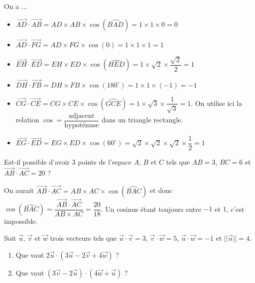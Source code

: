 \documentclass[11pt,fleqn, openany]{book} %
\begin{document}
\begin{solution}On a ...
\begin{itemize}
\item $\overrightarrow{AD} \cdot \overrightarrow{AB} = AD \times AB \times \cos (\widehat{BAD})=1 \times 1 \times 0 = 0$
\item $\overrightarrow{AD} \cdot \overrightarrow{FG} = AD \times FG \times \cos(0)=1 \times 1 \times 1 = 1$ 
\item $\overrightarrow{EH} \cdot \overrightarrow{ED} = EH \times ED \times \cos(\widehat{HED})=1 \times \sqrt{2} \times \dfrac{\sqrt{2}}{2}=1$ 
\item $\overrightarrow{DH} \cdot \overrightarrow{FB} = DH \times FB \times \cos (180^{\circ})=1 \times 1 \times (-1) = -1$
\item $\overrightarrow{CG} \cdot \overrightarrow{CE} = CG \times CE \times \cos(\widehat{GCE})=1 \times \sqrt{3} \times \dfrac{1}{\sqrt{3}}=1$. On utilise ici la relation $\cos = \dfrac{\text{adjacent}}{\text{hypoténuse}}$ dans un triangle rectangle.
\item $\overrightarrow{EG} \cdot \overrightarrow{ED} = EG \times ED \times \cos(60^{\circ})=\sqrt{2} \times \sqrt{2} \times \sqrt{2} \times \dfrac{1}{2} = 1$

\end{itemize}\end{solution}




\begin{exercise}Est-il possible d'avoir 3 points de l'espace $A$, $B$ et $C$ tels que $AB=3$, $BC=6$ et $\overrightarrow{AB} \cdot \overrightarrow{AC} = 20$ ?\end{exercise}

\begin{solution}On aurait $\overrightarrow{AB}\cdot \overrightarrow{AC}=AB \times AC \times \cos(\widehat{BAC})$ et donc $\cos(\widehat{BAC})=\dfrac{\overrightarrow{AB}\cdot\overrightarrow{AC}}{AB \times AC}=\dfrac{20}{18}$. Un cosinus étant toujours entre $-1$ et $1$, c'est impossible.\end{solution}





\begin{exercise}Soit $\vec u$, $\vec v$ et $\vec w$ trois vecteurs tels que $\vec u \cdot \vec v = 3$, $\vec v \cdot \vec w=5$, $\vec u \cdot \vec w = -1$ et $\lvert \lvert \vec u \rvert \rvert=4$. 
\begin{enumerate}
\item Que vaut $ 2\vec u \cdot (3 \vec u - 2 \vec v + 4\vec w)$ ?
\item Que vaut $(3\vec v - 2 \vec u) \cdot (4\vec w + \vec u)$ ?
\end{enumerate}\end{exercise}
\end{document}
